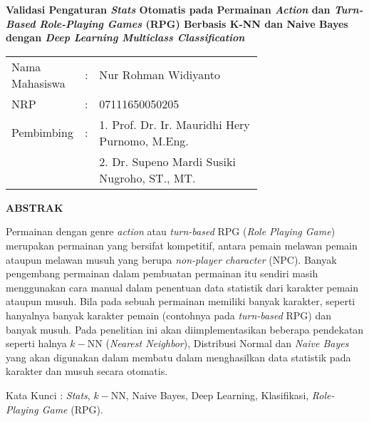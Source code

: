 \begin{spacing}{1}
	\begin{center}
		\Large\textbf{Validasi Pengaturan \textit{Stats} Otomatis pada Permainan \textit{Action} dan \textit{Turn-Based Role-Playing Games} (RPG) Berbasis K-NN dan Naive Bayes dengan \textit{Deep Learning Multiclass Classification}}
	\end{center}
	\vspace{2ex}
	
	\begin{adjustwidth}{-0.2cm}{}
		\begin{tabular}{lcp{0.7\linewidth}}
			Nama Mahasiswa &:& Nur Rohman Widiyanto \\
			NRP &:&	07111650050205 \\
			Pembimbing &:& 1. Prof. Dr. Ir. Mauridhi Hery Purnomo, M.Eng. \\
			& & 2. Dr. Supeno Mardi Susiki Nugroho, ST., MT. \\
		\end{tabular}
	\end{adjustwidth}
	\vspace{2ex}
	
	\begin{center}
		\Large\textbf{ABSTRAK}
	\end{center}
	\vspace{1ex}
	
	Permainan dengan genre \textit{action} atau \textit{turn-based} RPG (\textit{Role Playing Game}) merupakan permainan yang bersifat kompetitif, antara pemain melawan pemain ataupun melawan musuh yang berupa \textit{non-player character} (NPC). Banyak pengembang permainan dalam pembuatan permainan itu sendiri masih menggunakan cara manual dalam penentuan data statistik dari karakter pemain ataupun musuh. Bila pada sebuah permainan memiliki banyak karakter, seperti hanyalnya banyak karakter pemain (contohnya pada \textit{turn-based} RPG) dan banyak musuh. Pada penelitian ini akan diimplementasikan beberapa pendekatan seperti halnya $k-$NN (\textit{Nearest Neighbor}), Distribusi Normal dan \textit{Naive Bayes} yang akan digunakan dalam membatu dalam menghasilkan data statistik pada karakter dan musuh secara otomatis.
	\vspace{2ex}
	

	Kata Kunci : \textit{Stats}, $k-$NN, Naive Bayes, Deep Learning, Klasifikasi, \textit{Role-Playing Game} (RPG).
\end{spacing}